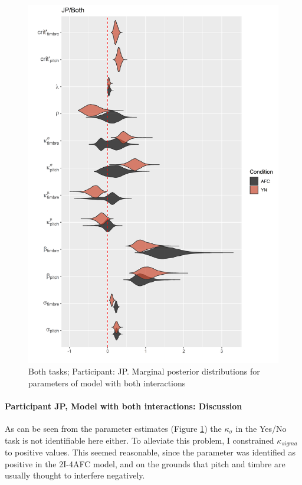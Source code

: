 \documentclass{article}\usepackage{knitr}
\begin{document}
\begin{figure}[H]
\centering
\includegraphics[scale=0.75, angle = 0]{Analysis_of_Human_Data/JP_YN_AFC_Both}
\caption{Both tasks; Participant: JP. Marginal posterior distributions for parameters of model with both interactions}
\label{fig:JP_YN_AFC_Both}
\end{figure}

\paragraph{Participant JP, Model with both interactions: Discussion}

As can be seen from the parameter estimates (Figure \ref{fig:JP_YN_AFC_Both}) the $\kappa_{\sigma}$ in the Yes/No task is not identifiable here either. To alleviate this problem, I constrained $\kappa_{sigma}$ to positive values. This seemed reasonable, since the parameter was identified as positive in the 2I-4AFC model, and on the grounds that pitch and timbre are usually thought to interfere negatively. 
\end{document}
